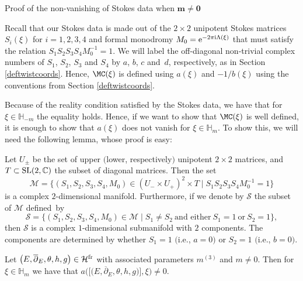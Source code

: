 \begin{subsubsection}{Proof of the non-vanishing of Stokes data when $\boldsymbol{m\neq 0}$}

Recall that our Stokes data is made out of the $2\times 2$ unipotent Stokes matrices $S_i(\xi)$ for $i=1,2,3,4$ and formal monodromy $M_0={\rm e}^{-2\pi {\rm i} \Lambda(\xi)}$ that must satisfy the relation $S_1S_2S_3S_4M_0^{-1}=1$. We will label the off-diagonal non-trivial complex numbers of $S_1$, $S_2$, $S_3$ and $S_4$ by $a$, $b$, $c$ and~$d$, respectively, as in Section \ref{deftwistcoords}. Hence, $\MC(\xi)$ is defined using $a(\xi)$ and $-1/b(\xi)$ using the conventions from Section \ref{deftwistcoords}.

Because of the reality condition satisfied by the Stokes data, we have that for $\xi \in \mathbb{H}_{-m}$ the equality  holds. Hence, if we want to show that $\MC(\xi)$ is well defined, it is enough to show that $a(\xi)$ does not vanish for $\xi \in \mathbb{H}_m$. To show this, we will need the following lemma, whose proof is easy:

\begin{Lemma}\label{nvm} Let $U_{\pm}$ be the set of upper $($lower, respectively$)$ unipotent $2\times 2$ matrices, and $T\subset {\rm SL}(2,\mathbb{C})$ the subset of diagonal matrices. Then the set
\begin{equation*}
 \mathcal{M}=\bigl\{(S_1,S_2,S_3,S_4,M_0)\in (U_{-}\times U_{+})^2\times T \mid S_1S_2S_3S_4M_0^{-1}=1\bigr\}
\end{equation*}
is a complex $2$-dimensional manifold. Furthermore, if we denote by $\mathcal{S}$ the subset of $\mathcal{M}$ defined~by
\begin{equation*}
 \mathcal{S}=\{(S_1,S_2,S_3,S_4,M_0) \in \mathcal{M} \mid S_1\neq S_2 \ \text{and either}\ S_1=1 \ \text{or}\ S_2=1\},
\end{equation*}
then $\mathcal{S}$ is a complex $1$-dimensional submanifold with $2$ components. The components are determined by whether $S_1=1$ $($i.e., $a=0)$ or $S_2=1$ $($i.e., $b=0)$.
\end{Lemma}

\begin{Proposition} \label{nonvan}Let $\bigl(E,\overline{\partial}_E,\theta, h, g\bigr)\in \mathcal{H}^{\textnormal{fr}}$ with associated parameters $m^{(3)}$ and $m\neq 0$. Then for $\xi \in \mathbb{H}_m$ we have that $a\bigl(\bigl[\bigl(E,\overline{\partial}_E,\theta, h, g\bigr)\bigr],\xi\bigr)\neq 0$.
\end{Proposition}


\end{subsubsection}
